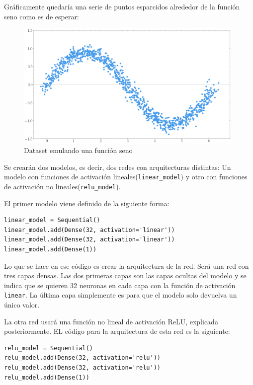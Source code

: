 Gráficamente quedaría una serie de puntos esparcidos alrededor de la función seno como es de esperar:
\begin{figure}[H]
    \centering
    \includegraphics[width=11cm]{images/state-of-art/activation-functions/sin.png}
    \caption{Dataset emulando una función seno}
    \label{fig:basicneuron}
\end{figure}

Se crearán dos modelos, es decir, dos redes con arquitecturas distintas: Un modelo con funciones de activación lineales(\verb|linear_model|) y otro con funciones de activación no lineales(\verb|relu_model|).
\newline

El primer modelo viene definido de la siguiente forma:

\begin{verbatim}
linear_model = Sequential()
linear_model.add(Dense(32, activation='linear'))
linear_model.add(Dense(32, activation='linear'))
linear_model.add(Dense(1))
\end{verbatim}

Lo que se hace en ese código es crear la arquitectura de la red. Será una red con tres capas densas. Las dos primeras capas son las capas ocultas del modelo y se indica que se quieren 32 neuronas en cada capa con la función de activación \verb|linear|. La última capa simplemente es para que el modelo solo devuelva un único valor.
\newline

La otra red usará una función no lineal de activación ReLU, explicada posteriormente. EL código para la arquitectura de esta red es la siguiente:
\begin{verbatim}
relu_model = Sequential()
relu_model.add(Dense(32, activation='relu'))
relu_model.add(Dense(32, activation='relu'))
relu_model.add(Dense(1))
\end{verbatim}

